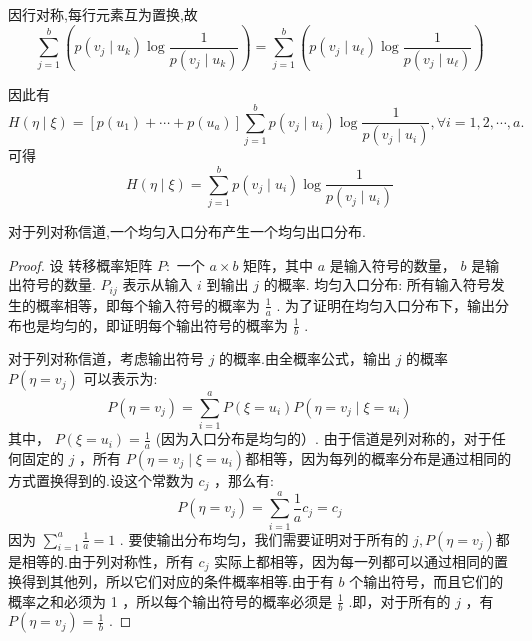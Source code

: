 因行对称,每行元素互为置换,故
$$
\sum_{j=1}^{b}\left(p\left(v_{j} \mid u_{k}\right) \log \frac{1}{p\left(v_{j} \mid u_{k}\right)}\right)=\sum_{j=1}^{b}\left(p\left(v_{j} \mid u_{\ell}\right) \log \frac{1}{p\left(v_{j} \mid u_{\ell}\right)}\right)
$$

因此有
$$
H(\eta \mid \xi)=\left[p\left(u_{1}\right)+\cdots+p\left(u_{a}\right)\right] \sum_{j=1}^{b} p\left(v_{j} \mid u_{i}\right) \log \frac{1}{p\left(v_{j} \mid u_{i}\right)}, 
\forall i=1,2, \cdots, a .
$$
可得
$$
H(\eta \mid \xi)=\sum_{j=1}^{b} p\left(v_{j} \mid u_{i}\right) \log \frac{1}{p\left(v_{j} \mid u_{i}\right)}
$$
\begin{theorem}
    对于列对称信道,一个均匀入口分布产生一个均匀出口分布.
\end{theorem}
\begin{proof}
设 转移概率矩阵 $ P: $ 一个 $ a \times b $ 矩阵，其中 $ a $ 是输入符号的数量， $ b $ 是输出符号的数量. $ P_{i j} $ 表示从输入 $ i $ 到输出 $ j $ 的概率. 均匀入口分布: 所有输入符号发生的概率相等，即每个输入符号的概率为 $ \frac{1}{a} $ . 为了证明在均匀入口分布下，输出分布也是均匀的，即证明每个输出符号的概率为 $ \frac{1}{b} $ .

对于列对称信道，考虑输出符号 $ j $ 的概率.由全概率公式，输出 $ j $ 的概率 $ P\left(\eta=v_{j}\right) $ 可以表示为:
$$
P\left(\eta=v_{j}\right)=\sum_{i=1}^{a} P\left(\xi=u_{i}\right) P\left(\eta=v_{j} \mid \xi=u_{i}\right)
$$
其中， $ P\left(\xi=u_{i}\right)=\frac{1}{a} $ (因为入口分布是均匀的）.
由于信道是列对称的，对于任何固定的 $ j $ ，所有 $ P\left(\eta=v_{j} \mid \xi=u_{i}\right) $都相等，因为每列的概率分布是通过相同的方式置换得到的.设这个常数为 $ c_{j} $ ，那么有:
$$
P\left(\eta=v_{j}\right)=\sum_{i=1}^{a} \frac{1}{a} c_{j}=c_{j}
$$
因为 $ \sum\limits_{i=1}^{a} \frac{1}{a}=1 $ .
要使输出分布均匀，我们需要证明对于所有的 $ j, P\left(\eta=v_{j}\right) $都是相等的.由于列对称性，所有 $ c_{j} $ 实际上都相等，因为每一列都可以通过相同的置换得到其他列，所以它们对应的条件概率相等.由于有 $ b $ 个输出符号，而且它们的概率之和必须为 1 ，所以每个输出符号的概率必须是 $ \frac{1}{b} $ .即，对于所有的 $ j $ ，有 $ P\left(\eta=v_{j}\right)=\frac{1}{b} $ .
\end{proof}



